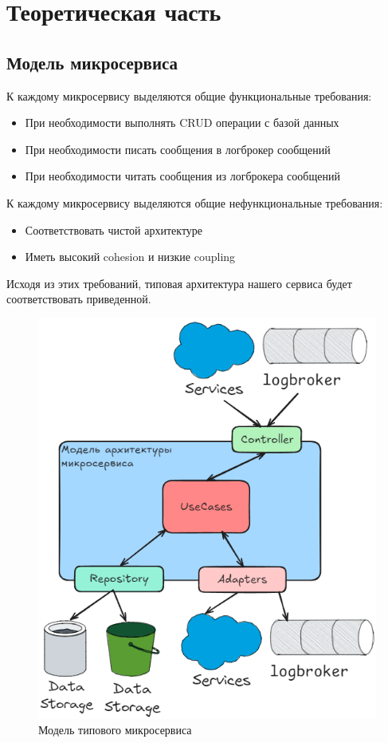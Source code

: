  \chapter{Теоретическая часть}

\section{Модель микросервиса}

К каждому микросервису выделяются общие функциональные требования:
\begin{itemize}
  \item При необходимости выполнять CRUD операции с базой данных
  \item При необходимости писать сообщения в логброкер сообщений
  \item При необходимости читать сообщения из логброкера сообщений
\end{itemize}

К каждому микросервису выделяются общие нефункциональные требования:
\begin{itemize}
  \item Соответствовать чистой архитектуре
  \item Иметь высокий cohesion и низкие coupling
\end{itemize}


Исходя из этих требований, типовая архитектура нашего сервиса будет соответствовать приведенной.

\begin{figure}[H]%
	\begin{center}
		\includegraphics[width=.5\columnwidth]{./img/tipovoy_micric.png}%
	\end{center}
	\caption{Модель типового микросервиса}%
	\label{pic:tipovoy_micric}%
\end{figure}

